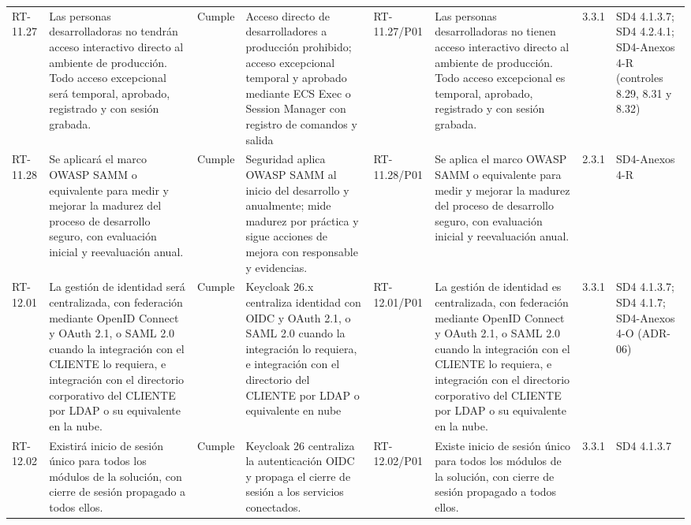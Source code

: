 \documentclass[oficio,firma,final]{lafrox}
\begin{document}
\begin{landscape}
{\begin{longtable}{@{}F{0.054} F{0.173} F{0.061} F{0.191} F{0.106} F{0.180} F{0.067} F{0.168}@{}}
  RT-11.27 & Las personas desarrolladoras no tendrán acceso interactivo directo al ambiente de producción. Todo acceso excepcional será temporal, aprobado, registrado y con sesión grabada. & Cumple & Acceso directo de desarrolladores a producción prohibido; acceso excepcional temporal y aprobado mediante ECS Exec o Session Manager con registro de comandos y salida & RT-11.27/\allowbreak{}P01 & Las personas desarrolladoras no tienen acceso interactivo directo al ambiente de producción. Todo acceso excepcional es temporal, aprobado, registrado y con sesión grabada. & 3.3.1 & SD4 4.1.3.7; SD4 4.2.4.1; SD4-Anexos 4-R (controles 8.29, 8.31 y 8.32)  \\
  RT-11.28 & Se aplicará el marco OWASP SAMM o equivalente para medir y mejorar la madurez del proceso de desarrollo seguro, con evaluación inicial y reevaluación anual. & Cumple & Seguridad aplica OWASP SAMM al inicio del desarrollo y anualmente; mide madurez por práctica y sigue acciones de mejora con responsable y evidencias. & RT-11.28/\allowbreak{}P01 & Se aplica el marco OWASP SAMM o equivalente para medir y mejorar la madurez del proceso de desarrollo seguro, con evaluación inicial y reevaluación anual. & 2.3.1 & SD4-Anexos 4-R  \\
  RT-12.01 & La gestión de identidad será centralizada, con federación mediante OpenID Connect y OAuth 2.1, o SAML 2.0 cuando la integración con el CLIENTE lo requiera, e integración con el directorio corporativo del CLIENTE por LDAP o su equivalente en la nube. & Cumple & Keycloak 26.x centraliza identidad con OIDC y OAuth 2.1, o SAML 2.0 cuando la integración lo requiera, e integración con el directorio del CLIENTE por LDAP o equivalente en nube & RT-12.01/\allowbreak{}P01 & La gestión de identidad es centralizada, con federación mediante OpenID Connect y OAuth 2.1, o SAML 2.0 cuando la integración con el CLIENTE lo requiera, e integración con el directorio corporativo del CLIENTE por LDAP o su equivalente en la nube. & 3.3.1 & SD4 4.1.3.7; SD4 4.1.7; SD4-Anexos 4-O (ADR-06)  \\
  RT-12.02 & Existirá inicio de sesión único para todos los módulos de la solución, con cierre de sesión propagado a todos ellos. & Cumple & Keycloak 26 centraliza la autenticación OIDC y propaga el cierre de sesión a los servicios conectados. & RT-12.02/\allowbreak{}P01 & Existe inicio de sesión único para todos los módulos de la solución, con cierre de sesión propagado a todos ellos. & 3.3.1 & SD4 4.1.3.7  \\

\end{longtable}}
\end{landscape}
\end{document}
